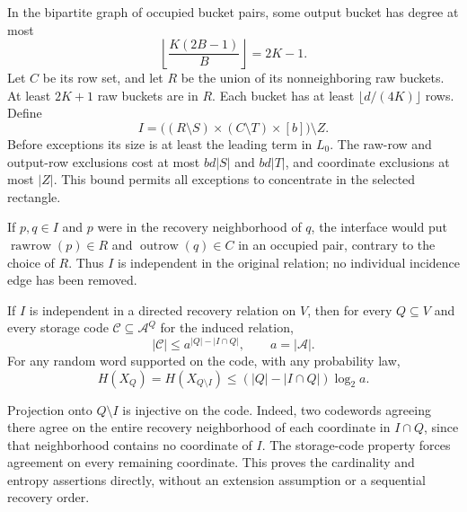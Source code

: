 \begin{outline}
In the bipartite graph of occupied bucket pairs, some output bucket has
degree at most
\[
 \left\lfloor\frac{K(2B-1)}B\right\rfloor=2K-1.
\]
Let $C$ be its row set, and let $R$ be the union of its nonneighboring
raw buckets.  At least $2K+1$ raw buckets are in $R$.  Each bucket has
at least $\lfloor d/(4K)\rfloor$ rows.  Define
\[
 I=\bigl((R\setminus S)\times(C\setminus T)\times[b]\bigr)\setminus Z.
\]
Before exceptions its size is at least the leading term in $L_0$.
The raw-row and output-row exclusions cost at most $bd|S|$ and $bd|T|$,
and coordinate exclusions at most $|Z|$.  This bound permits all exceptions
to concentrate in the selected rectangle.

If $p,q\in I$ and $p$ were in the recovery neighborhood of $q$, the
interface would put $\operatorname{rawrow}(p)\in R$ and
$\operatorname{outrow}(q)\in C$ in an occupied pair, contrary to the
choice of $R$.  Thus $I$ is independent in the original relation; no
individual incidence edge has been removed.
\end{outline}

\begin{lemma}
\label{lem:cd-independent-code}
If $I$ is independent in a directed recovery relation on $V$, then for
every $Q\subseteq V$ and every storage code $\mathcal C\subseteq
\mathcal A^Q$ for the induced relation,
\[
 |\mathcal C|\le a^{|Q|-|I\cap Q|},\qquad a=|\mathcal A|.
\]
For any random word supported on the code, with any probability law,
\[
 H(X_Q)=H(X_{Q\setminus I})\le(|Q|-|I\cap Q|)\log_2a.
\]
\end{lemma}

\begin{outline}
Projection onto $Q\setminus I$ is injective on the code.  Indeed, two
codewords agreeing there agree on the entire recovery neighborhood of
each coordinate in $I\cap Q$, since that neighborhood contains no
coordinate of $I$.  The storage-code property forces agreement on every
remaining coordinate.  This proves the cardinality and entropy assertions
directly, without an extension assumption or a sequential recovery order.
\end{outline}


